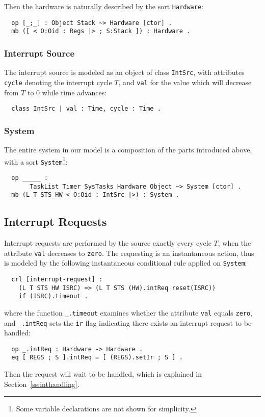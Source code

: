 \documentclass{llncs}
\begin{document}
Then the hardware is naturally described by the sort \verb|Hardware|:
\begin{verbatim}
  op [_;_] : Object Stack ~> Hardware [ctor] .
  mb ([ < O:Oid : Regs |> ; S:Stack ]) : Hardware .
\end{verbatim}

\subsubsection{Interrupt Source}
The interrupt source is modeled as an object of class \verb|IntSrc|,
with attributes \verb|cycle| denoting the interrupt cycle $T$, and
\verb|val| for the value which will decrease from $T$ to $0$ while
time advances:
\begin{verbatim}
  class IntSrc | val : Time, cycle : Time .
\end{verbatim}

\subsubsection{System}
The entire system in our model is a composition of the parts
introduced above, with a sort \verb|System|\footnote{Some variable
  declarations are not shown for simplicity.}:
\begin{verbatim}
  op _____ : 
       TaskList Timer SysTasks Hardware Object ~> System [ctor] .
  mb (L T STS HW < O:Oid : IntSrc |>) : System .
\end{verbatim}

\subsection{Interrupt Requests}
\label{ss:ir}
Interrupt requests are performed by the source exactly every cycle
$T$, when the attribute \verb|val| decreases to \verb|zero|. The
requesting is an instantaneous action, thus is modeled by the
following instantaneous conditional rule applied on \verb|System|:
\begin{verbatim}
  crl [interrupt-request] :
    (L T STS HW ISRC) => (L T STS (HW).intReq reset(ISRC))
    if (ISRC).timeout .
\end{verbatim}
where the function \verb|_.timeout| examines whether the attribute
\verb|val| equals \verb|zero|, and \verb|_.intReq| sets the \verb|ir|
flag indicating there exists an interrupt request to be handled:
\begin{verbatim}
  op _.intReq : Hardware -> Hardware .
  eq [ REGS ; S ].intReq = [ (REGS).setIr ; S ] .
\end{verbatim}
Then the request will wait to be handled, which is explained in
Section~\ref{ss:inthandling}.
\end{document}
